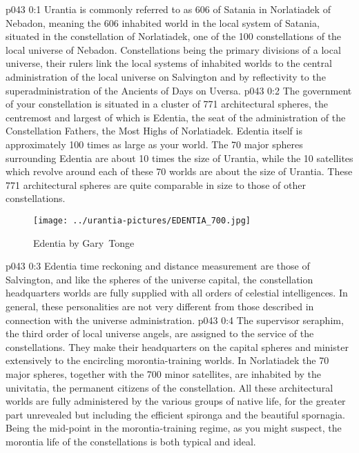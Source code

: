 \author{Malavatia Melchizedek}
\vs p043 0:1 Urantia is commonly referred to as 606 of Satania in Norlatiadek of Nebadon, meaning the 606 inhabited world in the local system of Satania, situated in the constellation of Norlatiadek, one of the 100 constellations of the local universe of Nebadon. Constellations being the primary divisions of a local universe, their rulers link the local systems of inhabited worlds to the central administration of the local universe on Salvington and by reflectivity to the superadministration of the Ancients of Days on Uversa.
\vs p043 0:2 \pc The government of your constellation is situated in a cluster of 771 architectural spheres, the centremost and largest of which is Edentia, the seat of the administration of the Constellation Fathers, the Most Highs of Norlatiadek. Edentia itself is approximately 100 times as large as your world. The 70 major spheres surrounding Edentia are about 10 times the size of Urantia, while the 10 satellites which revolve around each of these 70 worlds are about the size of Urantia. These 771 architectural spheres are quite comparable in size to those of other constellations.
\begin{figure}[H]
\centering
\texttt{[image: ../urantia-pictures/EDENTIA\_700.jpg]}
\caption{Edentia by Gary~Tonge}
\end{figure}
\vs p043 0:3 \pc Edentia time reckoning and distance measurement are those of Salvington, and like the spheres of the universe capital, the constellation headquarters worlds are fully supplied with all orders of celestial intelligences. In general, these personalities are not very different from those described in connection with the universe administration.
\vs p043 0:4 The supervisor seraphim, the third order of local universe angels, are assigned to the service of the constellations. They make their headquarters on the capital spheres and minister extensively to the encircling morontia\hyp{}training worlds. In Norlatiadek the 70 major spheres, together with the 700 minor satellites, are inhabited by the univitatia, the permanent citizens of the constellation. All these architectural worlds are fully administered by the various groups of native life, for the greater part unrevealed but including the efficient spironga and the beautiful spornagia. Being the mid\hyp{}point in the morontia\hyp{}training regime, as you might suspect, the morontia life of the constellations is both typical and ideal.
